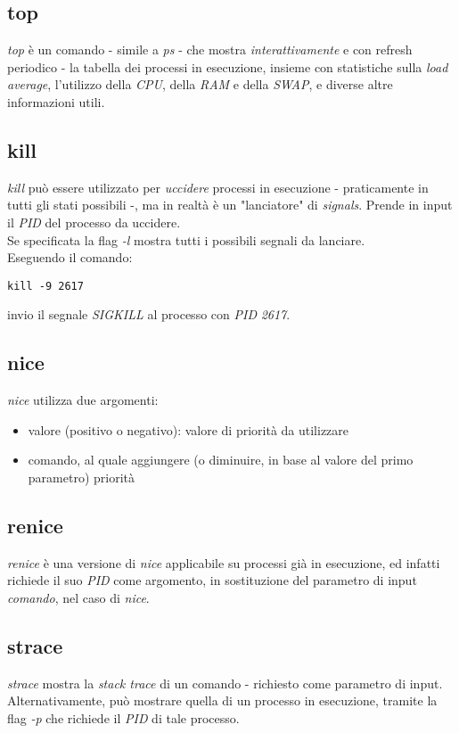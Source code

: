 \subsection{top}
\textit{top} è un comando - simile a \textit{ps} - che mostra \textit{interattivamente} e con refresh periodico - la tabella dei processi in esecuzione, insieme con statistiche sulla \textit{load average}, l'utilizzo della \textit{CPU}, della \textit{RAM} e della \textit{SWAP}, e diverse altre informazioni utili.

\subsection{kill}
\textit{kill} può essere utilizzato per \textit{uccidere} processi in esecuzione - praticamente in tutti gli stati possibili -, ma in realtà è un "lanciatore" di \textit{signals}.
Prende in input il \textit{PID} del processo da uccidere. \\
Se specificata la flag \textit{-l} mostra tutti i possibili segnali da lanciare. \\
Eseguendo il comando:
\begin{lstlisting}
kill -9 2617
\end{lstlisting}
invio il segnale \textit{SIGKILL} al processo con \textit{PID} \textit{2617}. 

\subsection{nice}
\textit{nice} utilizza due argomenti:
\begin{itemize}
    \item valore (positivo o negativo): valore di priorità da utilizzare
    \item comando, al quale aggiungere (o diminuire, in base al valore del primo parametro) priorità
\end{itemize}

\subsection{renice}
\textit{renice} è una versione di \textit{nice} applicabile su processi già in esecuzione, ed infatti richiede il suo \textit{PID} come argomento, in sostituzione del parametro di input \textit{comando}, nel caso di \textit{nice}.

\subsection{strace}
\textit{strace} mostra la \textit{stack trace} di un comando - richiesto come parametro di input. Alternativamente, può mostrare quella di un processo in esecuzione, tramite la flag \textit{-p} che richiede il \textit{PID} di tale processo.